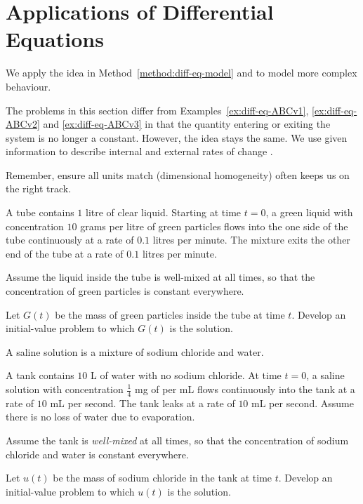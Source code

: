 \documentclass[../main.tex]{subfiles}
\begin{document}
 \section{Applications of Differential Equations}
We apply the idea in Method~\ref{method:diff-eq-model} and to model more complex behaviour. 

The problems in this section differ from Examples~\ref{ex:diff-eq-ABCv1}, \ref{ex:diff-eq-ABCv2} and \ref{ex:diff-eq-ABCv3} in that the quantity entering or exiting the system is no longer a constant. However, the idea stays the same. We use given information to describe internal and external rates of change .

\faStar{} Remember, ensure all units match (dimensional homogeneity) often keeps us on the right track.

\begin{example}
  A tube contains \(1\) litre of clear liquid. Starting at time \(t = 0\), a green liquid with concentration \(10\) grams per litre of green particles flows into the one side of the tube continuously at a rate of \(0.1\) litres per minute.  The mixture exits the other end of the tube at a rate of \(0.1\) litres per minute.

  Assume the liquid inside the tube is well-mixed at all times, so that the concentration of green particles is constant everywhere. 

  Let \(G(t)\) be the mass of green particles inside the tube at time \(t\). Develop an initial-value problem to which \(G(t)\) is the solution.
  
\end{example}
\clearpage

\begin{example} \label{ex:diff-eq-model-mixing-1}
  A saline solution is a mixture of sodium chloride and water. 

  A tank contains \(10\) L of water with no sodium chloride. At time \(t = 0\), a saline solution with concentration \(\tfrac{1}{4}\) mg of per mL flows continuously into the tank at a rate of \(10\) mL per second. The tank leaks at a rate of \(10\) mL per second. Assume there is no loss of water due to evaporation.

  Assume the tank is \emph{well-mixed} at all times, so that the concentration of sodium chloride and water is constant everywhere. 

  Let \(u(t)\) be the mass of sodium chloride in the tank at time \(t\).  Develop an initial-value problem to which \(u(t)\) is the solution. 

\end{example}
\clearpage
\end{document}

